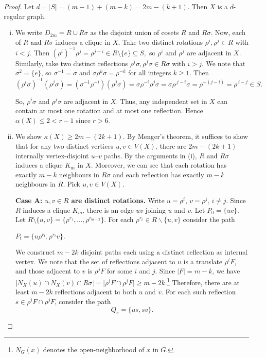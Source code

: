 \documentclass[12pt,reqno,a4paper]{amsart}
\theoremstyle{definition}
\begin{document}
\begin{proof}
Let $d=|S|=(m-1)+(m-k)=2m-(k+1)$. Then $X$ is a $d$-regular graph.

\begin{enumerate}[(i)]
    \item We write $D_{2m}=R\cup R\sigma$ as the disjoint union of cosets $R$ and $R\sigma$.
    Now, each of $R$ and $R\sigma$ induces a clique in $X$.
Take two distinct rotations \(\rho^i,\rho^j\in R\) with \(i< j\). Then
$
(\rho^i)^{-1}\rho^j=\rho^{j-i}\in R\setminus\{e\}\subseteq S,
$
so \(\rho^i\) and \(\rho^j\) are adjacent in $X$.
Similarly, take two distinct reflections \(\rho^i\sigma,\rho^j\sigma\in R\sigma\) with \(i> j\). 
We note that $\sigma^{2}=\{e\}$, so $\sigma^{-1}=\sigma$ and $\sigma\rho^{k}\sigma=\rho^{-k}$ for all integers $k\geq 1$.
Then
\[
(\rho^i\sigma)^{-1}(\rho^j\sigma)
= (\sigma^{-1}\rho^{-i})(\rho^j\sigma) 
= \sigma\rho^{-i}\rho^j\sigma
= \sigma\rho^{\,j-i}\sigma
= \rho^{-(j-i)}=\rho^{\,i-j}\in S.
\]

So, \(\rho^i\sigma\) and \(\rho^j\sigma\) are adjacent in $X$.
Thus, any independent set in $X$ can contain at most one rotation and at most one reflection. Hence $\alpha(X)\leq 2< r-1$ since $r> 6$.
    
\item We show $\kappa(X)\geq 2m-(2k+1)$. By Menger's theorem, it suffices to show that for any two distinct vertices
$u,v\in V(X)$, there are $2m-(2k+1)$ internally vertex-disjoint $u$--$v$ paths.
By the arguments in (i), $R$ and $R\sigma$ induces a clique $K_m$ in $X$. Moreover, we can see that each rotation has exactly $m-k$ neighbours in $R\sigma$ and each reflection has exactly $m-k$ neighbours in $R$.
Pick $u,v\in V(X)$.

\medskip\noindent\textbf{Case A: $u,v\in R$ are distinct rotations.}  
Write $u=\rho^i$, $v=\rho^j$, $i\ne j$. Since $R$ induces a clique $K_{m}$, there is an edge $uv$ joining $u$ and $v$. Let $P_{0}=\{uv\}$. 
Let $R\setminus\{u,v\}=\{\rho^{r_1},\dots,\rho^{r_{m-2}}\}$. For each $\rho^{r_t}\in R\backslash\{u,v\}$ consider the path
\begin{center}
$P_t= \{u\rho^{r_t}, \rho^{r_t}v\}$.    
\end{center}

We construct $m-2k$ disjoint paths each using a distinct reflection as internal vertex.
We note that the set of reflections
adjacent to $u$ is a translate $\rho^i F$, and those adjacent to $v$ is $\rho^j F$ for some $i$ and $j$. Since $|F|=m-k$, we have $\vert N_{X}(u)\cap N_{X}(v)\cap R\sigma\vert =\vert\rho^i F\cap \rho^j F\vert\geq m-2k$.\footnote{$N_{G}(x)$ denotes the open-neighborhood of $x$ in $G$.}
Therefore, there are at least $m-2k$ reflections adjacent to both $u$ and $v$.
For each such reflection $s\in \rho^i F\cap\rho^j F$, consider the path
\[
Q_s= \{us, sv\}.
\]


\end{enumerate}
\end{proof}
\end{document}
